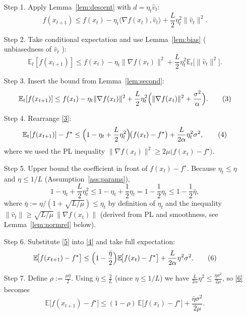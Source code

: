 \documentclass{article}
\begin{document}
\begin{enumerate}
\item[Step 1.] Apply Lemma~\ref{lem:descent} with $d=\eta_t\hat v_t$:
\[
f(x_{t+1})\le f(x_t)-\eta_t\langle\nabla f(x_t),\hat v_t\rangle
            +\frac{L}{2}\eta_t^{2}\|\hat v_t\|^{2}.
\tag{1}
\]

\item[Step 2.] Take conditional expectation and use Lemma~\ref{lem:bias}
( unbiasedness of $\hat v_t$ ):
\[
\mathbb{E}_t[f(x_{t+1})]\le f(x_t)-\eta_t\|\nabla f(x_t)\|^{2}
                     +\frac{L}{2}\eta_t^{2}\mathbb{E}_t\!\bigl[\|\hat v_t\|^{2}\bigr].
\tag{2}
\]

\item[Step 3.] Insert the bound from Lemma~\ref{lem:second}:
\[
\mathbb{E}_t[f(x_{t+1})]\le
f(x_t)-\eta_t\|\nabla f(x_t)\|^{2}
+\frac{L}{2}\eta_t^{2}\Bigl(\|\nabla f(x_t)\|^{2}+\frac{\sigma^{2}}{\alpha}\Bigr).
\tag{3}
\]

\item[Step 4.] Rearrange \eqref{3}:
\[
\mathbb{E}_t[f(x_{t+1})]-f^\star
\le
\Bigl(1-\eta_t+\frac{L}{2}\eta_t^{2}\Bigr)\!\bigl(f(x_t)-f^\star\bigr)
+\frac{L}{2\alpha}\eta_t^{2}\sigma^{2},
\tag{4}
\]
where we used the PL inequality
$\|\nabla f(x_t)\|^{2}\ge 2\mu\bigl(f(x_t)-f^\star\bigr)$.

\item[Step 5.] Upper bound the coefficient in front of $f(x_t)-f^\star$.
Because $\eta_t\le\eta$ and $\eta\le 1/L$ (Assumption~\ref{ass:params}),
\[
1-\eta_t+\frac{L}{2}\eta_t^{2}
\le 1-\eta_t+\frac{1}{2}\eta_t
=1-\frac{1}{2}\eta_t
\le 1-\frac{1}{2}\bar\eta,
\tag{5}
\]
where $\bar\eta:=\eta/(1+\sqrt{L/\mu})\le \eta_t$ by definition of $\eta_t$
and the inequality $\|\hat v_t\|\ge\sqrt{L/\mu}\,\|\nabla f(x_t)\|$
(derived from PL and smoothness, see Lemma~\ref{lem:normrel} below).

\item[Step 6.] Substitute \eqref{5} into \eqref{4} and take full expectation:
\[
\mathbb{E}\!\bigl[f(x_{t+1})-f^\star\bigr]
\le\Bigl(1-\frac{\bar\eta}{2}\Bigr)\mathbb{E}\!\bigl[f(x_{t})-f^\star\bigr]
    +\frac{L}{2\alpha}\eta^{2}\sigma^{2}.
\tag{6}
\]

\item[Step 7.] Define $\rho:=\frac{\mu\bar\eta}{2}$.
Using $\bar\eta\le \frac{2}{L}$ (since $\eta\le 1/L$) we have
$\frac{L}{2\alpha}\eta^{2}\le \frac{\bar\eta\sigma^{2}}{2\mu}$,
so \eqref{6} becomes
\[
\mathbb{E}\!\bigl[f(x_{t+1})-f^\star\bigr]
\le (1-\rho)\,\mathbb{E}\!\bigl[f(x_{t})-f^\star\bigr]
   +\frac{\bar\eta\sigma^{2}}{2\mu}.
\tag{7}
\]


\end{enumerate}
\end{document}
